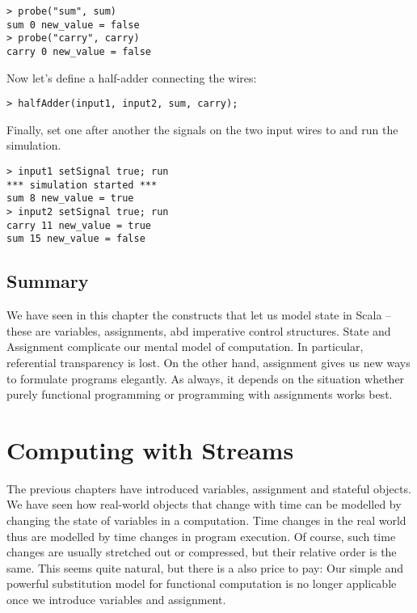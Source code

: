 \documentclass[a4paper,12pt,twoside,titlepage]{book}
\begin{document}
{\begin{lstlisting}
> probe("sum", sum)
sum 0 new_value = false
> probe("carry", carry)
carry 0 new_value = false
\end{lstlisting}
Now let's define a half-adder connecting the wires:
\begin{lstlisting}
> halfAdder(input1, input2, sum, carry);
\end{lstlisting}
Finally, set one after another the signals on the two input wires to
 and run the simulation.
\begin{lstlisting}
> input1 setSignal true; run
*** simulation started ***
sum 8 new_value = true
> input2 setSignal true; run
carry 11 new_value = true
sum 15 new_value = false
\end{lstlisting}

\section{Summary}

We have seen in this chapter the constructs that let us model state in
Scala -- these are variables, assignments, abd imperative control
structures.  State and Assignment complicate our mental model of
computation.  In particular, referential transparency is lost.  On the
other hand, assignment gives us new ways to formulate programs
elegantly. As always, it depends on the situation whether purely
functional programming or programming with assignments works best.

\chapter{Computing with Streams}

The previous chapters have introduced variables, assignment and
stateful objects.  We have seen how real-world objects that change
with time can be modelled by changing the state of variables in a
computation.  Time changes in the real world thus are modelled by time
changes in program execution. Of course, such time changes are usually
stretched out or compressed, but their relative order is the same.
This seems quite natural, but there is a also price to pay: Our simple
and powerful substitution model for functional computation is no
longer applicable once we introduce variables and assignment.

}
\end{document}
